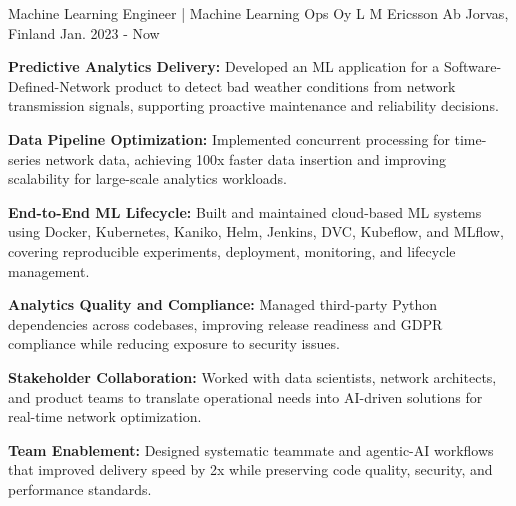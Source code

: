 

\begin{cventries}

    \cventry
            {Machine Learning Engineer | Machine Learning Ops} %
            {Oy L M Ericsson Ab} %
            {Jorvas, Finland} %
            {Jan. 2023 - Now} %
            {
                \begin{cvitems}
                    \item \textbf{Predictive Analytics Delivery:} Developed an ML application for a Software-Defined-Network product to detect bad weather conditions from network transmission signals, supporting proactive maintenance and reliability decisions.
                    \item \textbf{Data Pipeline Optimization:} Implemented concurrent processing for time-series network data, achieving 100x faster data insertion and improving scalability for large-scale analytics workloads.
                    \item \textbf{End-to-End ML Lifecycle:} Built and maintained cloud-based ML systems using Docker, Kubernetes, Kaniko, Helm, Jenkins, DVC, Kubeflow, and MLflow, covering reproducible experiments, deployment, monitoring, and lifecycle management.
                    \item \textbf{Analytics Quality and Compliance:} Managed third-party Python dependencies across codebases, improving release readiness and GDPR compliance while reducing exposure to security issues.
                    \item \textbf{Stakeholder Collaboration:} Worked with data scientists, network architects, and product teams to translate operational needs into AI-driven solutions for real-time network optimization.
                    \item \textbf{Team Enablement:} Designed systematic teammate and agentic-AI workflows that improved delivery speed by 2x while preserving code quality, security, and performance standards.
                \end{cvitems}
            }

\end{cventries}
